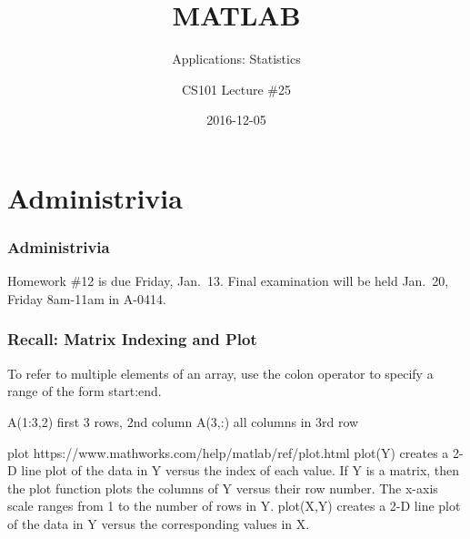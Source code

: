 \documentclass[11pt]{beamer}
\title{MATLAB}
\subtitle{Applications:  Statistics}
\author{CS101 Lecture \#25}
\date{2016-12-05}
\begin{document}
  \setcounter{showProgressBar}{0}
  \setcounter{showSlideNumbers}{0}

\frame{\titlepage}

\setcounter{framenumber}{0}
\setcounter{showProgressBar}{1}
\setcounter{showSlideNumbers}{1}

\section{Administrivia}

\begin{frame}
  \frametitle{Administrivia}
  \Enlarge

   \begin{itemize}
   	\myitem  Homework \#12 is due Friday, Jan.\ 13.  %
   	\myitem  Final examination will be held Jan.\ 20, Friday 8am-11am in A-0414.  %
   \end{itemize}
\end{frame}

\begin{frame}[fragile]
	\frametitle{Recall: Matrix Indexing and Plot}
	
	\begin{enumerate}
		\myitem  To refer to multiple elements of an array, use the colon operator to specify a range of the form start:end. 
		\begin{enumerate}
			\mysubitem  A(1:3,2) first 3 rows, 2nd column
			\mysubitem  A(3,:)  all columns in 3rd row
		\end{enumerate}
		\myitem plot https://www.mathworks.com/help/matlab/ref/plot.html
		\myitem plot(Y) creates a 2-D line plot of the data in Y versus the index of each value. If Y is a matrix, then the plot function plots the columns of Y versus their row number. The x-axis scale ranges from 1 to the number of rows in Y.
		\myitem plot(X,Y) creates a 2-D line plot of the data in Y versus the corresponding values in X.
	\end{enumerate}
\end{frame}
\end{document}
